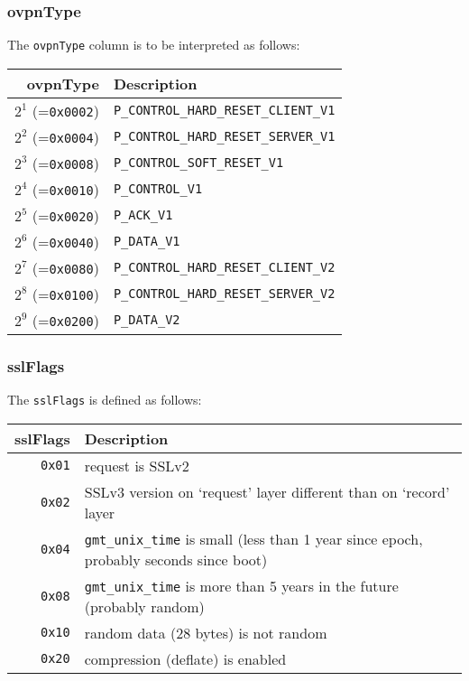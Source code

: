 \documentclass[documentation]{subfiles}
\begin{document}
\subsubsection{ovpnType}\label{ovpnType}
The {\tt ovpnType} column is to be interpreted as follows:
\begin{longtable}{rl}
    \toprule
    {\bf ovpnType} & {\bf Description} \\
    \midrule\endhead%
    $2^{1}$ (={\tt 0x0002}) & {\tt P\_CONTROL\_HARD\_RESET\_CLIENT\_V1}\\
    $2^{2}$ (={\tt 0x0004}) & {\tt P\_CONTROL\_HARD\_RESET\_SERVER\_V1}\\
    $2^{3}$ (={\tt 0x0008}) & {\tt P\_CONTROL\_SOFT\_RESET\_V1}\\
    $2^{4}$ (={\tt 0x0010}) & {\tt P\_CONTROL\_V1}\\
    $2^{5}$ (={\tt 0x0020}) & {\tt P\_ACK\_V1}\\
    $2^{6}$ (={\tt 0x0040}) & {\tt P\_DATA\_V1}\\
    $2^{7}$ (={\tt 0x0080}) & {\tt P\_CONTROL\_HARD\_RESET\_CLIENT\_V2}\\
    $2^{8}$ (={\tt 0x0100}) & {\tt P\_CONTROL\_HARD\_RESET\_SERVER\_V2}\\
    $2^{9}$ (={\tt 0x0200}) & {\tt P\_DATA\_V2}\\
    \bottomrule
\end{longtable}

\subsubsection{sslFlags}\label{sslFlags}
The {\tt sslFlags} is defined as follows:
\begin{longtable}{rl}
    \toprule
    {\bf sslFlags} & {\bf Description}\\
    \midrule\endhead%
    {\tt 0x01} & request is SSLv2\\
    {\tt 0x02} & SSLv3 version on `request' layer different than on `record' layer\\
    {\tt 0x04} & {\tt gmt\_unix\_time} is small (less than 1 year since epoch, probably seconds since boot)\\
    {\tt 0x08} & {\tt gmt\_unix\_time} is more than 5 years in the future (probably random)\\
    {\tt 0x10} & random data (28 bytes) is not random\\
    {\tt 0x20} & compression (deflate) is enabled\\
    \bottomrule
\end{longtable}
\end{document}
